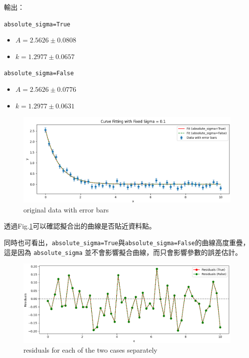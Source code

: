 \documentclass[12pt,a4paper]{article}
\begin{document}
\begin{CJK}{UTF8}{bkai}
輸出：

\texttt{absolute\_sigma=True}
\begin{itemize}
    \item $A=2.5626 \pm 0.0808$
    \item $k=1.2977 \pm 0.0657$
\end{itemize}

\texttt{absolute\_sigma=False}
\begin{itemize}
    \item $A=2.5626 \pm 0.0776$
    \item $k=1.2977 \pm 0.0631$
\end{itemize}

\begin{figure}[h]
    \centering
    \includegraphics[width=1\linewidth]{output1.png}
    \caption{original data with error bars}
    \label{fig:op1}
\end{figure}

透過Fig.\ref{fig:op1}可以確認擬合出的曲線是否貼近資料點。

同時也可看出，\texttt{absolute\_sigma=True}與\texttt{absolute\_sigma=False}的曲線高度重疊，這是因為 \texttt{absolute\_sigma} 並不會影響擬合曲線，而只會影響參數的誤差估計。

\clearpage

\begin{figure}[h]
    \centering
    \includegraphics[width=1\linewidth]{output2.png}
    \caption{residuals for each of the two cases separately}
    \label{fig:op-2}
\end{figure}


\end{CJK}
\end{document}
